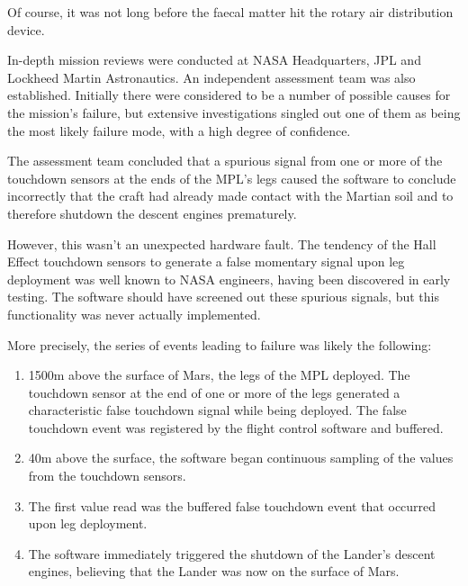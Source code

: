 \documentclass{article}
\begin{document}
Of course, it was not long before the faecal matter hit the rotary air
distribution device.

In-depth mission reviews were conducted at NASA Headquarters, JPL and
Lockheed Martin Astronautics. An independent assessment team was also
established. Initially there were considered to be a number of possible
causes for the mission's failure, but extensive investigations singled
out one of them as being the most likely failure mode, with a high
degree of confidence.

The assessment team concluded that a spurious signal from one or more of
the touchdown sensors at the ends of the MPL's legs caused the software
to conclude incorrectly that the craft had already made contact with the
Martian soil and to therefore shutdown the descent engines prematurely.

However, this wasn't an unexpected hardware fault. The tendency of the
Hall Effect touchdown sensors to generate a false momentary signal upon
leg deployment was well known to NASA engineers, having been discovered
in early testing. The software should have screened out these spurious
signals, but this functionality was never actually implemented.

More precisely, the series of events leading to failure was likely the
following:

\begin{enumerate}
\item 1500m above the surface of Mars, the legs of the MPL deployed. The
touchdown sensor at the end of one or more of the legs generated a
characteristic false touchdown signal while being deployed. The false
touchdown event was registered by the flight control software and
buffered.\\
\item 40m above the surface, the software began continuous sampling of the
values from the touchdown sensors.\\
\item The first value read was the buffered false touchdown event that
occurred upon leg deployment.
\item The software immediately triggered the shutdown of the Lander's
descent engines, believing that the Lander was now on the surface of
Mars.
\end{enumerate}
\end{document}
